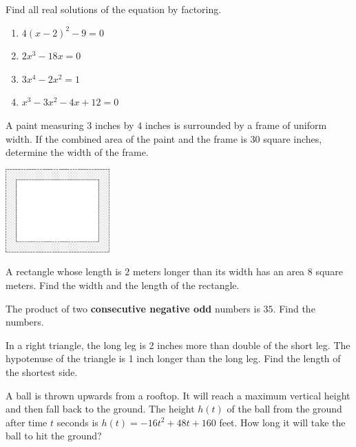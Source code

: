 \documentclass[en,11pt]{elegantbook}
\let\BeginKnitrBlock\begin \let\EndKnitrBlock\end
\begin{document}
\BeginKnitrBlock{exercise}
\protect\hypertarget{exr:unnamed-chunk-118}{}{\label{exr:unnamed-chunk-118} }
Find all real solutions of the equation by factoring.

\begin{enumerate}
\def\labelenumi{\arabic{enumi}.}

\item
  \(4(x-2)^2-9=0\)
\item
  \(2x^3-18x=0\)
\item
  \(3x^4-2x^2=1\)
\item
  \(x^3-3x^2-4x+12=0\)
\end{enumerate}
\EndKnitrBlock{exercise}

\BeginKnitrBlock{exercise}
\protect\hypertarget{exr:unnamed-chunk-119}{}{\label{exr:unnamed-chunk-119} }
A paint measuring \(3\) inches by \(4\) inches is surrounded by a frame of uniform width. If the combined area of the paint and the frame is \(30\) square inches, determine the width of the frame.

\includegraphics[width=0.3\textwidth,height=\textheight]{figs/tikz-paint-uniform-width.png}\\
\EndKnitrBlock{exercise}

\BeginKnitrBlock{exercise}
\protect\hypertarget{exr:unnamed-chunk-120}{}{\label{exr:unnamed-chunk-120} }
A rectangle whose length is \(2\) meters longer than its width has an area \(8\) square meters. Find the width and the length of the rectangle.
\EndKnitrBlock{exercise}

\BeginKnitrBlock{exercise}
\protect\hypertarget{exr:unnamed-chunk-121}{}{\label{exr:unnamed-chunk-121} }
The product of two \textbf{consecutive negative odd} numbers is \(35\). Find the numbers.
\EndKnitrBlock{exercise}

\BeginKnitrBlock{exercise}
\protect\hypertarget{exr:unnamed-chunk-122}{}{\label{exr:unnamed-chunk-122} }
In a right triangle, the long leg is 2 inches more than double of the short leg. The hypotenuse of the triangle is 1 inch longer than the long leg. Find the length of the shortest side.
\EndKnitrBlock{exercise}

\BeginKnitrBlock{exercise}
\protect\hypertarget{exr:unnamed-chunk-123}{}{\label{exr:unnamed-chunk-123} }
A ball is thrown upwards from a rooftop. It will reach a maximum vertical height and then fall back to the ground. The height \(h(t)\) of the ball from the ground after time \(t\) seconds is \(h(t)=-16t^2 + 48t + 160\) feet. How long it will take the ball to hit the ground?
\EndKnitrBlock{exercise}
\end{document}
